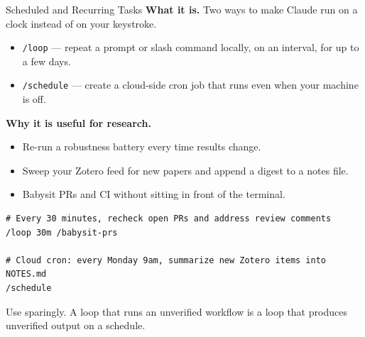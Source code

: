 \documentclass[aspectratio=169, 11pt]{beamer}
\begin{document}
\begin{frame}[fragile]{Scheduled and Recurring Tasks}
  \textbf{What it is.} Two ways to make Claude run on a clock instead of on your keystroke.
  \begin{itemize}\small
    \item \texttt{/loop} --- repeat a prompt or slash command locally, on an interval, for up to a few days.
    \item \texttt{/schedule} --- create a cloud-side cron job that runs even when your machine is off.
  \end{itemize}

  \vspace{0.4em}
  \textbf{Why it is useful for research.}
  \begin{itemize}\small
    \item Re-run a robustness battery every time results change.
    \item Sweep your Zotero feed for new papers and append a digest to a notes file.
    \item Babysit PRs and CI without sitting in front of the terminal.
  \end{itemize}

  \vspace{0.3em}
  \begin{lstlisting}[basicstyle=\ttfamily\footnotesize]
# Every 30 minutes, recheck open PRs and address review comments
/loop 30m /babysit-prs

# Cloud cron: every Monday 9am, summarize new Zotero items into NOTES.md
/schedule
  \end{lstlisting}

  \vspace{0.2em}
  {\small Use sparingly. A loop that runs an unverified workflow is a loop that produces unverified output on a schedule.}
\end{frame}

\end{document}
